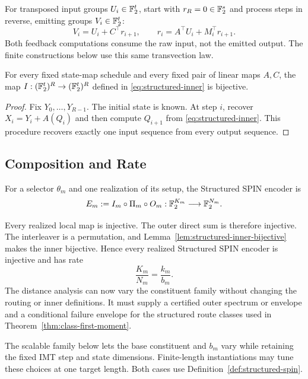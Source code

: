 For transposed input groups $U_i\in\mathbb F_2^t$, start with $r_R=0\in\mathbb F_2^s$
and process steps in reverse, emitting groups $V_i\in\mathbb F_2^t$:
\[
 V_i=U_i+C^\top r_{i+1},\qquad
 r_i=A^\top U_i+M_i^\top r_{i+1}.
\]
Both feedback computations consume the raw input, not the emitted output.
The finite constructions below use this same transvection law.

\begin{lemma}
\label{lem:structured-inner-bijective}
For every fixed state-map schedule and every fixed pair of linear maps
$A,C$, the map $I:(\mathbb F_2^t)^R\to(\mathbb F_2^t)^R$ defined in
\eqref{eq:structured-inner} is bijective.
\end{lemma}

\begin{proof}
Fix $Y_0,\ldots,Y_{R-1}$. The initial state is known. At step $i$, recover
$X_i=Y_i+A(Q_i)$ and then compute $Q_{i+1}$ from \eqref{eq:structured-inner}. This procedure
recovers exactly one input sequence from every output sequence.
\end{proof}

\subsection{Composition and Rate}

\begin{definition}
\label{def:structured-spin}
For a selector $\theta_m$ and one realization of its setup, the Structured
SPIN encoder is
\begin{equation}
  E_m
  :=
  I_m\circ\Pi_m\circ O_m
  :\mathbb F_2^{K_m}\longrightarrow\mathbb F_2^{N_m}.
  \label{eq:structured-spin-encoder}
\end{equation}
\end{definition}

Every realized local map is injective. The outer direct sum is therefore
injective. The interleaver is a permutation, and
Lemma~\ref{lem:structured-inner-bijective} makes the inner bijective. Hence
every realized Structured SPIN encoder is injective and has rate
\begin{equation}
  \frac{K_m}{N_m}=\frac{k_m}{b_m}.
  \label{eq:structured-spin-rate}
\end{equation}
The distance analysis can now vary the constituent family without changing
the routing or inner definitions. It must supply a certified outer spectrum
or envelope and a conditional failure envelope for the structured route
classes used in Theorem~\ref{thm:class-first-moment}.

The scalable family below lets the base constituent and $b_m$ vary while
retaining the fixed IMT step and state dimensions. Finite-length
instantiations may tune these choices at one target length. Both cases use
Definition~\ref{def:structured-spin}.
